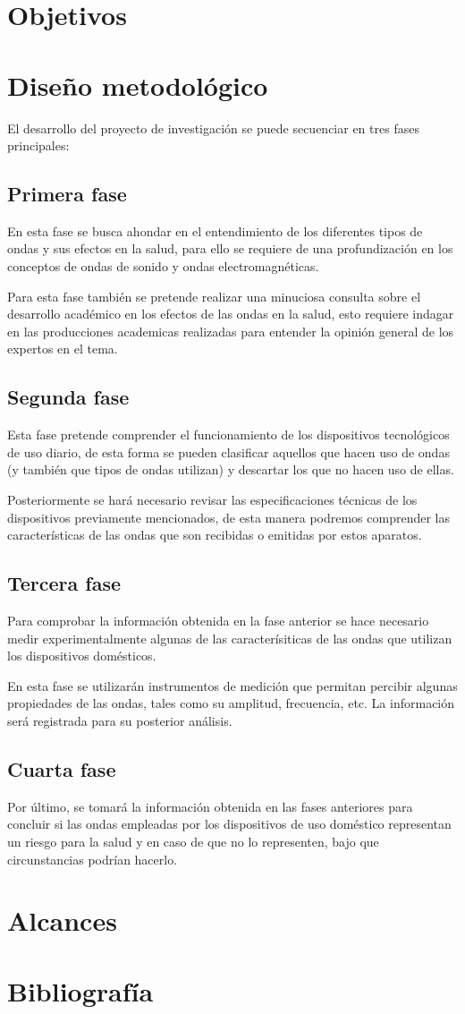 \documentclass[spanish,notitlepage,letterpaper, 12pt]{article}
\begin{document}
\section{Objetivos}
\section{Diseño metodológico}
El desarrollo del proyecto de investigación se puede secuenciar en tres fases principales:
\subsection{Primera fase}
En esta fase se busca ahondar en el entendimiento de los diferentes tipos de ondas y sus efectos en la salud, para ello se requiere de una profundización en los conceptos de ondas de sonido y ondas electromagnéticas.\par
\bigskip
Para esta fase también se pretende realizar una minuciosa consulta sobre el desarrollo académico en los efectos de las ondas en la salud, esto requiere indagar en las producciones academicas realizadas para entender la opinión general de los expertos en el tema.

\subsection{Segunda fase}
Esta fase pretende comprender el funcionamiento de los dispositivos tecnológicos de uso diario, de esta forma se pueden clasificar aquellos que hacen uso de ondas (y también que tipos de ondas utilizan) y descartar los que no hacen uso de ellas.\par
\bigskip
Posteriormente se hará necesario revisar las especificaciones técnicas de los dispositivos previamente mencionados, de esta manera podremos comprender las características de las ondas que son recibidas o emitidas por estos aparatos.
\subsection{Tercera fase}
Para comprobar la información obtenida en la fase anterior se hace necesario medir experimentalmente algunas de las caracterísiticas de las ondas que utilizan los dispositivos domésticos.\par
\bigskip
En esta fase se utilizarán instrumentos de medición que permitan percibir algunas propiedades de las ondas, tales como su amplitud, frecuencia, etc. La información será registrada para su posterior análisis.
\subsection{Cuarta fase}
Por último, se tomará la información obtenida en las fases anteriores para concluir si las ondas empleadas por los dispositivos de uso doméstico representan un riesgo para la salud y en caso de que no lo representen, bajo que circunstancias podrían hacerlo.
\section{Alcances}
\section{Bibliografía} 


\end{document}
